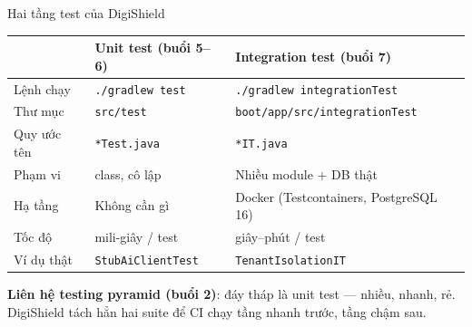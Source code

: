 \documentclass[aspectratio=169,12pt]{beamer}
\begin{document}
\begin{frame}{Hai tầng test của DigiShield}
  \renewcommand{\arraystretch}{1.15}
  \footnotesize
  \begin{tabularx}{\textwidth}{l>{\raggedright\arraybackslash}X>{\raggedright\arraybackslash}X}
    \toprule
    & \textbf{Unit test (buổi 5--6)} & \textbf{Integration test (buổi 7)} \\
    \midrule
    Lệnh chạy & \texttt{./gradlew test} & \texttt{./gradlew integrationTest} \\
    Thư mục & \texttt{src/test} & \texttt{boot/app/src/\allowbreak integrationTest} \\
    Quy ước tên & \texttt{*Test.java} & \texttt{*IT.java} \\
    Phạm vi & 1 class, cô lập & Nhiều module + DB thật \\
    Hạ tầng & Không cần gì & Docker (Testcontainers, PostgreSQL 16) \\
    Tốc độ & mili-giây / test & giây--phút / test \\
    Ví dụ thật & \texttt{StubAiClientTest} & \texttt{TenantIsolationIT} \\
    \bottomrule
  \end{tabularx}
  \renewcommand{\arraystretch}{1}

  \vspace{0.3em}
  {\small \textbf{Liên hệ testing pyramid (buổi 2)}: đáy tháp là unit test ---
  nhiều, nhanh, rẻ. DigiShield tách hẳn hai suite để CI chạy tầng nhanh trước,
  tầng chậm sau.}
\end{frame}
\end{document}
